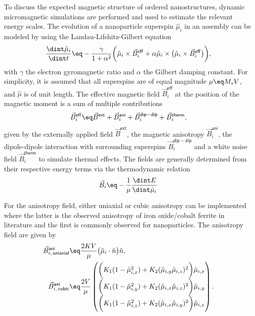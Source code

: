 \documentclass[\main/dresen_thesis.tex]{subfiles}
\begin{document}
  To discuss the expected magnetic structure of ordered nanostructures, dynamic micromagnetic simulations are performed and used to estimate the relevant energy scales.
  The evolution of a nanoparticle superspin $\hat{\mu}_i$ in an assembly can be modeled by using the Landau-Lifshitz-Gilbert equation
  \begin{align}
    \frac{\dint \hat{\mu}_i}{\dint t} \eq - \frac{\gamma}{1 + \alpha^2} \biggl( \hat{\mu}_i \times \vec{B}_i^\mathsf{eff} + \alpha \hat{\mu}_i \times \bigl(\hat{\mu}_i \times \vec{B}_i^\mathsf{eff} \bigr) \biggr),
  \end{align}
  with $\gamma$ the electron gyromagnetic ratio and $\alpha$ the Gilbert damping constant.
  For simplicity, it is assumed that all superspins are of equal magnitude $\mu \eq M_s V$, and $\hat{\mu}$ is of unit length.
  The effective magnetic field $\vec{B}_i^\mathsf{eff}$ at the position of the magnetic moment is a sum of multiple contributions
  \begin{align}
    \vec{B}_i^\mathsf{eff} \eq \vec{B}^\mathsf{ext} + \vec{B}^\mathsf{ani}_i + \vec{B}^\mathsf{dip-dip}_i + \vec{B}^\mathsf{therm}_i,
  \end{align}
  given by the externally applied field $\vec{B}^\mathsf{ext}$, the magnetic anisotropy $\vec{B}^\mathsf{ani}_i$, the dipole-dipole interaction with surrounding superspins $\vec{B}^\mathsf{dip-dip}_i$ and a white noise field $\vec{B}^\mathsf{therm}_i$ to simulate thermal effects.
  The fields are generally determined from their respective energy terms via the thermodynamic relation
  \begin{align}
    \vec{B}_i \eq - \frac{1}{\mu} \frac{\dint E}{\dint \hat{\mu}_i}
  \end{align}

  For the anisotropy field, either uniaxial or cubic anisotropy can be implemented where the latter is the observed anisotropy of iron oxide/cobalt ferrite in literature and the first is commonly observed for nanoparticles.
  The anisotropy field are given by
  \begin{align}
    \vec{B}^\mathsf{ani}_{i, \,\mathsf{uniaxial}} &\eq \frac{2 K V}{\mu} \bigl( \hat{\mu}_i \cdot \hat{n} \bigr) \hat{n},\\
    \vec{B}^\mathsf{ani}_{i, \,\mathsf{cubic}} &\eq \frac{2 V}{\mu} \begin{pmatrix}
      \biggl(K_1 (1 - \hat{\mu}_{i, x}^2) + K_2 (\hat{\mu}_{i, y} \hat{\mu}_{i, z})^2 \biggr) \hat{\mu}_{i, x} \\
      \biggl(K_1 (1 - \hat{\mu}_{i, y}^2) + K_2 (\hat{\mu}_{i, x} \hat{\mu}_{i, z})^2 \biggr) \hat{\mu}_{i, y} \\
      \biggl(K_1 (1 - \hat{\mu}_{i, z}^2) + K_2 (\hat{\mu}_{i, x} \hat{\mu}_{i, y})^2 \biggr) \hat{\mu}_{i, z}
      \end{pmatrix}.
  \end{align}
\end{document}
